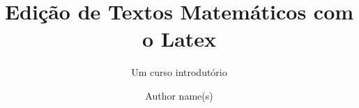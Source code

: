 \documentclass[graybox,envcountchap,sectrefs]{svmono}
\begin{document}
\author{Author name(s)}
\title{ Edi\c c\~ao de Textos Matem\'aticos com o Latex}
\subtitle{Um curso introdut\'orio}
\maketitle

\frontmatter%






\tableofcontents




\mainmatter%




\backmatter%


\printindex

\end{document}
